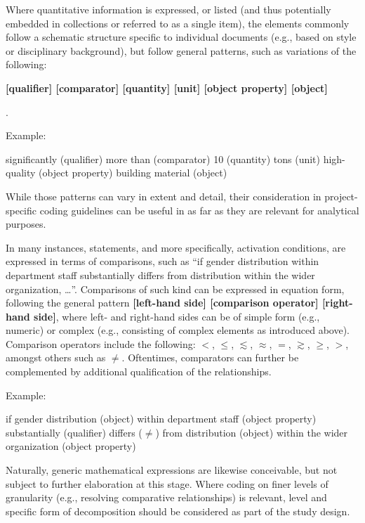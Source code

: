 \sp

 Where quantitative information is expressed, or listed (and thus potentially embedded in collections or referred to as a single item), the elements commonly follow a schematic structure specific to individual documents (e.g., based on style or disciplinary background), but follow general patterns, such as variations of the following: \begin{exi}\textbf{[qualifier] [comparator] [quantity] [unit] [object property] [object]}\end{exi}. 

\sp

Example: \begin{exi}significantly (qualifier) more than (comparator) 10 (quantity) tons (unit) high-quality (object property) building material (object)\end{exi}

\sp

While those patterns can vary in extent and detail, their consideration in project-specific coding guidelines can be useful in as far as they are relevant for analytical purposes.

\sp

 In many instances, statements, and more specifically, activation conditions, are expressed in terms of comparisons, such as ``if gender distribution within department staff substantially differs from distribution within the wider organization, \dots''. Comparisons of such kind can be expressed in equation form, following the general pattern \textbf{[left-hand side] [comparison operator] [right-hand side]}, where left- and right-hand sides can be of simple form (e.g., numeric) or complex (e.g., consisting of complex elements as introduced above). Comparison operators include the following: $<$, $\leq$, $\lesssim$, $\approx$, $=$, $\gtrsim$, $\geq$, $>$, amongst others such as $\neq$. Oftentimes, comparators can further be complemented by additional qualification of the relationships. 

\sp

Example: \begin{exi}if gender distribution (object) within department staff (object property) substantially (qualifier) differs ($\neq$) from distribution (object) within the wider organization (object property)\end{exi}

\sp

Naturally, generic mathematical expressions are likewise conceivable, but not subject to further elaboration at this stage. Where coding on finer levels of granularity (e.g., resolving comparative relationships) is relevant, level and specific form of decomposition should be considered as part of the study design.
\newpage

